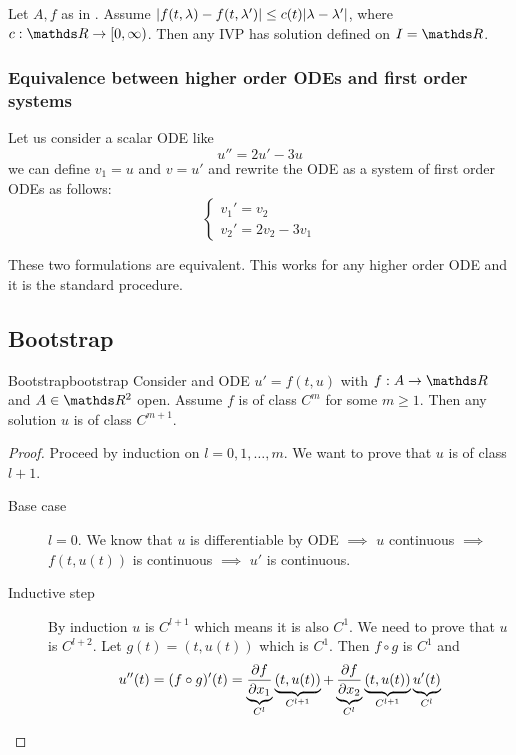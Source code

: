 \documentclass[12pt]{extarticle}
\begin{document}
\begin{theorem}{}{}
	Let $A, f$ as in .
	Assume $\abs{f(t, \lambda) - f(t, \lambda')} \leq c(t)\abs{\lambda - \lambda'}$, where $c: \R \to [0, \infty)$.
	Then any IVP has solution defined on $I = \R$.
\end{theorem}

\subsubsection{Equivalence between higher order ODEs and first order systems}

Let us consider a scalar ODE like
\begin{equation}
	u'' = 2 u' - 3u
\end{equation}
we can define $v_1 = u$ and $v = u'$ and rewrite the ODE as a system of first order ODEs as follows:
\begin{equation}
	\begin{cases}
		v_1' = v_2 \\
		v_2' = 2 v_2 - 3v_1
	\end{cases}
\end{equation}

These two formulations are equivalent.
This works for any higher order ODE and it is the standard procedure.

\subsection{Bootstrap}

\begin{proposition}{Bootstrap}{bootstrap}
	Consider and ODE $u' = f(t, u)$ with $f : A \to \R$ and $A \in \R^2$ open.
	Assume $f$ is of class $C^m$ for some $m \geq 1$.
	Then any solution $u$ is of class $C^{m+1}$.
\end{proposition}

\begin{proof}
	Proceed by induction on $l = 0, 1, \dots, m$.
	We want to prove that $u$ is of class $l +1$.
	\begin{description}
		\item[Base case] $l = 0$. We know that $u$ is differentiable by ODE $\implies$ $u$ continuous $\implies$ $f(t, u(t))$ is continuous $\implies$ $u'$ is continuous.
		\item[Inductive step] By induction $u$ is $C^{l+1}$ which means it is also $C^1$.
		      We need to prove that $u$ is $C^{l+2}$.
		      Let $g(t) = (t, u(t))$ which is $C^1$.
		      Then $f \circ g$ is $C^1$ and
		      \begin{equation}
			      u''(t) = (f \circ g)'(t) = \underbrace{\pdv{f}{x_1}()}_{C^l} \underbrace{(t, u(t))}_{C^{l+1}} + \underbrace{\pdv{f}{x_2}()}_{C^l}\underbrace{(t, u(t))}_{C^{l+1}} \underbrace{u'(t)}_{C^l}
		      \end{equation}
	\end{description}
\end{proof}
\end{document}
